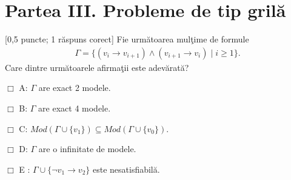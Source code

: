 \documentclass[12pt]{article}
\newcommand{\probex}{\stepcounter{uebno}{\vspace{0.3cm}\noindent \bf (P\arabic{uebno}) }}
\newcommand{\solutiong}[1]{$\,$ \\ \begin{proof}\mbox{}\\#1 \qed \end{proof}}
\renewcommand{\boxtimes}{\Box}
\renewcommand{\solutiong}[1]{}
\begin{document}
\section*{Partea III. Probleme de tip gril\u a}


\probex[0,5 puncte; 1 r\u{a}spuns corect] Fie urm\u{a}toarea mul\c{t}ime de formule 
\begin{align*}
\Gamma = \{ (v_i \to v_{i + 1}) \wedge (v_{i + 1} \to v_i) \mid i \geq 1 \}. 
\end{align*}
Care dintre urm\u{a}toarele afirma\c{t}ii este adev\u{a}rat\u{a}? 

$\Box$ A: $\Gamma$ are exact 2 modele. 

$\boxtimes$ B: $\Gamma$ are exact 4 modele. 

$\Box$ C: $Mod(\Gamma \cup \{v_1\}) \subseteq Mod(\Gamma \cup \{v_0\})$.

$\Box$ D: $\Gamma$ are o infinitate de modele. 

$\Box$ E : $\Gamma \cup \{ \neg v_1 \to v_2 \}$ este nesatisfiabil\u{a}.

\solutiong{
    Observ\u{a}m c\u{a} pentru orice evaluare $e$, avem c\u{a} 
    \begin{align*}
        &\iff e \in Mod(\Gamma) \\ 
        &\iff \text{ pentru orice $i \geq 1$, } e^+(v_i \leftrightarrow v_{i + 1}) = 1 \\
        &\iff \text{ pentru orice $i \geq 1$, } e(v_i) = e(v_{i + 1}) \\
        &\iff \text{ pentru orice } i \geq 1, e(v_i) = 0 \text{ sau pentru orice } i \geq 1, e(v_i) = 1
    \end{align*}
    A\c{s}adar, modelele lui $\Gamma$ sunt exact evalu\u{a}rile $e_0, e_1, e_2, e_3 : V \to \{0, 1\}$ 
    definite prin
    \begin{align*}
        \text{pentru orice $i \in \N$},\ e_0(v_i) = 0 \\ 
        \text{pentru orice $i \in \N$},\ e_1(v_i) = 1 \\ 
        e_2(v_0) = 0 \ \text{\c{s}i pentru orice $i \geq 1$},\ e_2(v_i) = 1 \\ 
        e_3(v_0) = 1 \ \text{\c{s}i pentru orice $i \geq 1$},\ e_3(v_i) = 0.
    \end{align*}
    Deci B este adev\u{a}rat\u{a}, iar A, D sunt false. \\ 
    C: Avem c\u{a} $e_2$ definit mai sus este model pentru $\Gamma \cup \{v_1\}$,
    dar nu \c{s}i pentru $\Gamma \cup \{v_0\}$. \\
    E: $e_1$ este model pentru $\Gamma \cup \{ \neg v_1 \to v_2 \}$.
}
 
\end{document}

